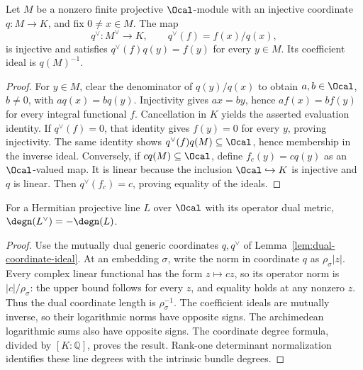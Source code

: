 \begin{lemma}
\label{lem:dual-coordinate-ideal}
\leanok
Let $M$ be a nonzero finite projective $\Ocal$-module with an injective
coordinate $q:M\to K$, and fix $0\ne x\in M$. The map
\[
 q^\vee:M^\vee\longrightarrow K,\qquad
 q^\vee(f)=f(x)/q(x),
\]
is injective and satisfies $q^\vee(f)q(y)=f(y)$ for every $y\in M$.
Its coefficient ideal is $q(M)^{-1}$.
\end{lemma}
\begin{proof}
For $y\in M$, clear the denominator of $q(y)/q(x)$ to obtain
$a,b\in\Ocal$, $b\ne0$, with $a q(x)=b q(y)$. Injectivity gives
$ax=by$, hence $af(x)=bf(y)$ for every integral functional $f$.
Cancellation in $K$ yields the asserted evaluation identity. If $q^\vee(f)=0$,
that identity gives $f(y)=0$ for every $y$, proving injectivity.
The same identity shows $q^\vee(f)q(M)\subseteq\Ocal$, hence membership
in the inverse ideal. Conversely, if $c q(M)\subseteq\Ocal$, define
$f_c(y)=c q(y)$ as an $\Ocal$-valued map. It is linear because the
inclusion $\Ocal\hookrightarrow K$ is injective and $q$ is linear.
Then $q^\vee(f_c)=c$, proving equality of the ideals.
\end{proof}

\begin{lemma}
\label{lem:line-dual-degree}
\leanok
{}
For a Hermitian projective line $L$ over $\Ocal$ with its operator dual
metric, $\degn(L^\vee)=-\degn(L)$.
\end{lemma}
\begin{proof}
Use the mutually dual generic coordinates $q,q^\vee$ of
Lemma~\ref{lem:dual-coordinate-ideal}. At an embedding $\sigma$, write the
norm in coordinate $q$ as $\rho_\sigma|z|$. Every complex linear functional
has the form $z\mapsto cz$, so its operator norm is
$|c|/\rho_\sigma$: the upper bound follows for every $z$, and equality
holds at any nonzero $z$. Thus the dual coordinate length is
$\rho_\sigma^{-1}$. The coefficient ideals are mutually inverse, so their
logarithmic norms have opposite signs. The archimedean logarithmic sums
also have opposite signs. The coordinate degree formula, divided by
$[K:\mathbb Q]$, proves the result. Rank-one determinant normalization
identifies these line degrees with the intrinsic bundle degrees.
\end{proof}

